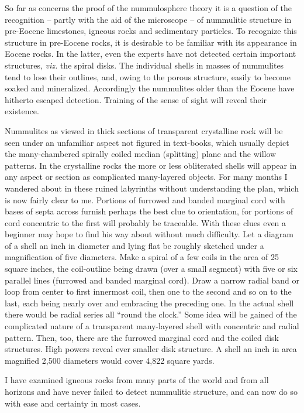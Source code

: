 \documentclass[a4paper, 12pt, oneside]{article}
\begin{document}
So far as concerns the proof of the nummulosphere theory it is a question of the recognition -- partly with the aid of the microscope -- of nummulitic structure in pre-Eocene limestones, igneous rocks and sedimentary particles. To recognize this structure in pre-Eocene rocks, it is desirable to be familiar with its appearance in Eocene rocks. In the latter, even the experts have not detected certain important structures, \emph{viz.} the spiral disks. The individual shells in masses of nummulites tend to lose their outlines, and, owing to the porous structure, easily to become soaked and mineralized. Accordingly the nummulites older than the Eocene have hitherto escaped detection. Training of the sense of sight will reveal their existence.

Nummulites as viewed in thick sections of transparent crystalline rock will be seen under an unfamiliar aspect not figured in text-books, which usually depict the many-chambered spirally coiled median (splitting) plane and the willow patterns. In the crystalline rocks the more or less obliterated shells will appear in any aspect or section as complicated many-layered objects. For many months I wandered about in these ruined labyrinths without understanding the plan, which is now fairly clear to me. Portions of furrowed and banded marginal cord with bases of septa across furnish perhaps the best clue to orientation, for portions of cord concentric to the first will probably be traceable. With these clues even a beginner may hope to find his way about without much difficulty. Let a diagram of a shell an inch in diameter and lying flat be roughly sketched under a magnification of five diameters. Make a spiral of a few coils in the area of 25 square inches, the coil-outline being drawn (over a small segment) with five or six parallel lines (furrowed and banded marginal cord). Draw a narrow radial band or loop from center to first innermost coil, then one to the second and so on to the last, each being nearly over and embracing the preceding one. In the actual shell there would be radial series all ``round the clock.'' Some idea will be gained of the complicated nature of a transparent many-layered shell with concentric and radial pattern. Then, too, there are the furrowed marginal cord and the coiled disk structures. High powers reveal ever smaller disk structure. A shell an inch in area magnified 2,500 diameters would cover 4,822 square yards.

I have examined igneous rocks from many parts of the world and from all horizons and have never failed to detect nummulitic structure, and can now do so with ease and certainty in most cases.
\end{document}
